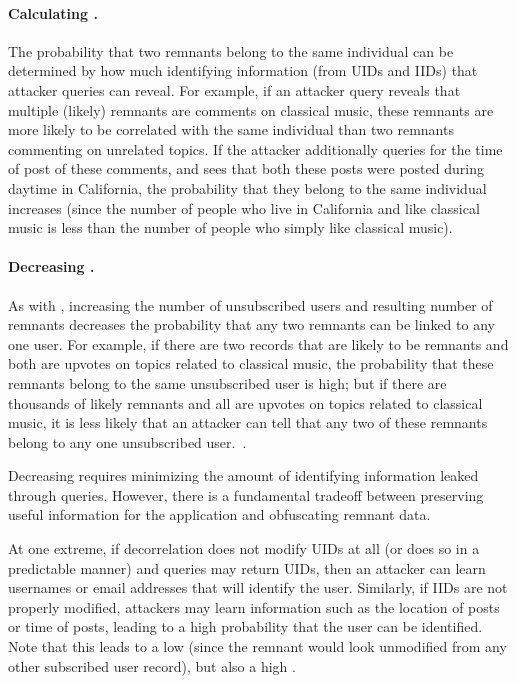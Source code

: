 \paragraph{Calculating \plinked{}.}
The probability that two remnants belong to the same individual can be determined by how much
identifying information (from UIDs and IIDs) that attacker queries can reveal.
For example, if an attacker query reveals that multiple
(likely) remnants are comments on classical music, these remnants are more likely to be
correlated with the same individual than two remnants commenting on unrelated topics. If the
attacker additionally queries for the time of post of these comments, and sees that both these posts
were posted during daytime in California, the probability that they belong to the same individual
increases (since the number of people who live in California and like classical music is less than
the number of people who simply like classical music).

\paragraph{Decreasing \plinked{}.}
As with \premnant{}, increasing the number of unsubscribed users and resulting
number of remnants decreases the probability that any two remnants can be linked to any one
user. For example, if there are two records that are likely to be remnants and both are upvotes on topics related to
classical music, the probability that these remnants belong to the same unsubscribed user is high; but if
there are thousands of likely remnants and all are upvotes on topics related to classical music, it
is less likely that an attacker can tell that any two of these remnants belong to any one
unsubscribed user.~.

Decreasing \plinked{} requires minimizing the amount of identifying information leaked
through queries. However, there is a fundamental tradeoff between preserving useful information for
the application and obfuscating remnant data. 

At one extreme, if decorrelation does not modify UIDs at all (or does so in a predictable manner)
and queries may return UIDs, then an attacker can learn usernames or email addresses that will
identify the user. Similarly, if IIDs are not properly modified, attackers may learn
information such as the location of posts or time of posts, leading to a high probability
that the user can be identified.  Note that this leads to a low \premnant{} (since the
remnant would look unmodified from any other subscribed user record), but also a high \plinked{}.

